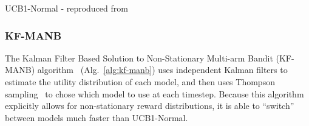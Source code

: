 \begin{algorithm}[t]
    \caption{UCB1-Normal - reproduced from~\cite{Auer2002}}
    \label{alg:ucb1normal}
    \begin{algorithmic}
            \vspace{-11pt}
        \EndFor
    \end{algorithmic}
\end{algorithm}


\subsubsection{KF-MANB}
The Kalman Filter Based Solution to Non-Stationary Multi-arm Bandit (KF-MANB) algorithm~\cite{Granmo2010} (Alg.~\ref{alg:kf-manb}) uses independent Kalman filters to estimate the utility distribution of each model, and then uses Thompson sampling~\cite{Agrawal2012} to chose which model to use at each timestep. Because this algorithm explicitly allows for non-stationary reward distributions, it is able to ``switch'' between models much faster than UCB1-Normal.

